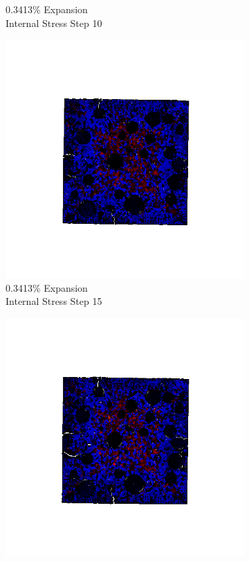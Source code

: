 \begin{figure}[ht!]
\begin{subfigure}{.25\textwidth}
      \caption{0.3413\% Expansion\\Internal Stress Step 10}
    \end{subfigure}%
    \begin{subfigure}{.25\textwidth}
      \centering
      \includegraphics[width=1.0\linewidth]{Files/exp_3D/DEF/A15X0C_2_s15.png}
      \caption{0.3413\% Expansion\\Internal Stress Step 15}
    \end{subfigure}%
    \begin{subfigure}{.25\textwidth}
      \centering
      \includegraphics[width=1.0\linewidth]{Files/exp_3D/DEF/A15X0C_2_stress.png}

\end{subfigure}
\end{figure}
